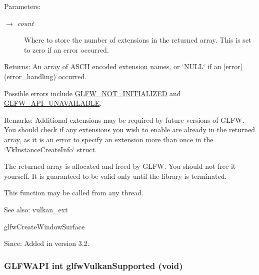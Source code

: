 \begin{Desc}
\item[Parameters:]
\begin{description}
\item[\mbox{$\rightarrow$} {\em count}]Where to store the number of extensions in the returned array. This is set to zero if an error occurred. \end{description}
\end{Desc}
\begin{Desc}
\item[Returns:]An array of ASCII encoded extension names, or `NULL` if an \mbox{[}error\mbox{]}(error\_\-handling) occurred.\end{Desc}
Possible errors include \hyperlink{group__errors_g2374ee02c177f12e1fa76ff3ed15e14a}{GLFW\_\-NOT\_\-INITIALIZED} and \hyperlink{group__errors_g56882b290db23261cc6c053c40c2d08e}{GLFW\_\-API\_\-UNAVAILABLE}.

\begin{Desc}
\item[Remarks:]Additional extensions may be required by future versions of GLFW. You should check if any extensions you wish to enable are already in the returned array, as it is an error to specify an extension more than once in the `VkInstanceCreateInfo` struct.\end{Desc}
The returned array is allocated and freed by GLFW. You should not free it yourself. It is guaranteed to be valid only until the library is terminated.

This function may be called from any thread.

\begin{Desc}
\item[See also:]vulkan\_\-ext 

glfwCreateWindowSurface\end{Desc}
\begin{Desc}
\item[Since:]Added in version 3.2. \end{Desc}
\hypertarget{group__vulkan_g72e7c3757d9ff2333181a5569bb7c403}{
\subsubsection[glfwVulkanSupported]{\setlength{\rightskip}{0pt plus 5cm}GLFWAPI int glfwVulkanSupported (void)}}
\label{group__vulkan_g72e7c3757d9ff2333181a5569bb7c403}


